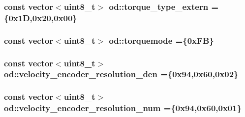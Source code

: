 \subsubsection[{\texorpdfstring{torque\+\_\+type\+\_\+extern}{torque_type_extern}}]{\setlength{\rightskip}{0pt plus 5cm}const vector$<$uint8\+\_\+t$>$ od\+::torque\+\_\+type\+\_\+extern =\{0x1\+D,0x20,0x00\}}\hypertarget{namespaceod_afc052d3983ca0866a0b8cd5d0fc5deaa}{}\label{namespaceod_afc052d3983ca0866a0b8cd5d0fc5deaa}
\subsubsection[{\texorpdfstring{torquemode}{torquemode}}]{\setlength{\rightskip}{0pt plus 5cm}const vector$<$uint8\+\_\+t$>$ od\+::torquemode =\{0x\+F\+B\}}\hypertarget{namespaceod_a53c06ba9dc3fe72c8fd5fed43563a4a0}{}\label{namespaceod_a53c06ba9dc3fe72c8fd5fed43563a4a0}
\subsubsection[{\texorpdfstring{velocity\+\_\+encoder\+\_\+resolution\+\_\+den}{velocity_encoder_resolution_den}}]{\setlength{\rightskip}{0pt plus 5cm}const vector$<$uint8\+\_\+t$>$ od\+::velocity\+\_\+encoder\+\_\+resolution\+\_\+den =\{0x94,0x60,0x02\}}\hypertarget{namespaceod_a2b157384b9a0fb00e80e99438f24f5de}{}\label{namespaceod_a2b157384b9a0fb00e80e99438f24f5de}
\subsubsection[{\texorpdfstring{velocity\+\_\+encoder\+\_\+resolution\+\_\+num}{velocity_encoder_resolution_num}}]{\setlength{\rightskip}{0pt plus 5cm}const vector$<$uint8\+\_\+t$>$ od\+::velocity\+\_\+encoder\+\_\+resolution\+\_\+num =\{0x94,0x60,0x01\}}\hypertarget{namespaceod_ace9cc22d0ccd7e2ac1b14fb14151ed73}{}\label{namespaceod_ace9cc22d0ccd7e2ac1b14fb14151ed73}

